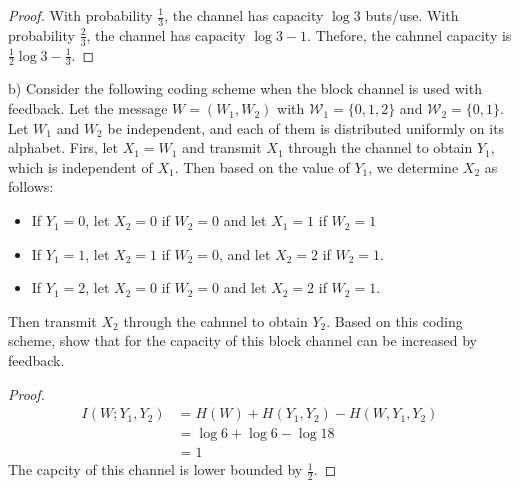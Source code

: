 \documentclass[../main.tex]{subfiles}
\begin{document}
\begin{proof}
    With probability $\frac{1}{3}$, the channel has capacity $\log 3$ buts/use. With probability $\frac{2}{3}$, the channel has capacity $\log 3 -1$. Thefore, the cahnnel capacity is $\frac{1}{2}\log 3 -\frac{1}{3}$.
\end{proof}
b) Consider the following coding scheme when the block channel is used with feedback. Let the message $W=(W_1,W_2)$ with $\mathcal{W}_1=\{0,1,2\}$ and $\mathcal{W}_2=\{0,1\}$. Let $W_1$ and $W_2$ be independent, and each of them is distributed uniformly on its alphabet. Firs, let $X_1=W_1$ and transmit $X_1$ through the channel to obtain $Y_1$, which is independent of $X_1$. Then based on the value of $Y_1$, we determine $X_2$ as follows: 
\begin{itemize}
    \item If $Y_1=0$, let $X_2=0$ if $W_2=0$ and let $X_1=1$ if $W_2=1$
    \item If $Y_1=1$, let $X_2=1$ if $W_2=0$, and let $X_2=2$ if $W_2=1$.
    \item If $Y_1=2$, let $X_2=0$ if $W_2=0$ and let $X_2=2$ if $W_2=1$.
\end{itemize}
Then transmit $X_2$ through the cahnnel to obtain $Y_2$. Based on this coding scheme, show that for the capacity of this block channel can be increased by feedback.
\begin{proof}
    \begin{align*}
        I(W;Y_1,Y_2) &= H(W) + H(Y_1,Y_2)-H(W,Y_1,Y_2)\\
        &= \log 6 + \log 6 - \log 18\\
        &= 1
    \end{align*}
    The capcity of this channel is lower bounded by $\frac{1}{2}$.
\end{proof}
\end{document}
